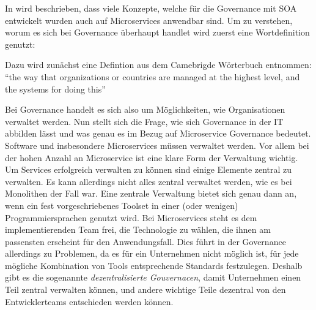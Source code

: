 In  wird beschrieben, dass viele Konzepte, welche für die Governance mit \ac{SOA} entwickelt wurden auch auf Microservices anwendbar sind. Um zu verstehen, worum es sich bei Governance überhaupt handlet wird zuerst eine Wortdefinition genutzt:

\begin{definition}[Governance] Dazu wird zunächst eine Defintion aus dem Camebrigde Wörterbuch entnommen:
	\enquote{the way that organizations or countries are managed at the highest level, and the systems for doing this}\autocite{camebdrigeGovernance}
\end{definition}

Bei Governance handelt es sich also um Möglichkeiten, wie Organisationen verwaltet werden. Nun stellt sich die Frage, wie sich Governance in der IT abbilden lässt und was genau es im Bezug auf Microservice Governance bedeutet. Software und insbesondere Microservices müssen verwaltet werden. Vor allem bei der hohen Anzahl an Microservice ist eine klare Form der Verwaltung wichtig. Um Services erfolgreich verwalten zu können sind einige Elemente zentral zu verwalten. Es kann allerdings nicht alles zentral verwaltet werden, wie es bei Monolithen der Fall war. Eine zentrale Verwaltung bietet sich genau dann an, wenn ein fest vorgeschriebenes Toolset in einer (oder wenigen) Programmiersprachen genutzt wird. Bei Microservices steht es dem implementierenden Team frei, die Technologie zu wählen, die ihnen am passensten erscheint für den Anwendungsfall. Dies führt in der Governance allerdings zu Problemen, da es für ein Unternehmen nicht möglich ist, für jede mögliche Kombination von Tools entsprechende Standards festzulegen. Deshalb gibt es die sogenannte \textit{dezentralisierte Gouvernacen}, damit Unternehmen einen Teil zentral verwalten können, und andere wichtige Teile dezentral von den Entwicklerteams entschieden werden können.

